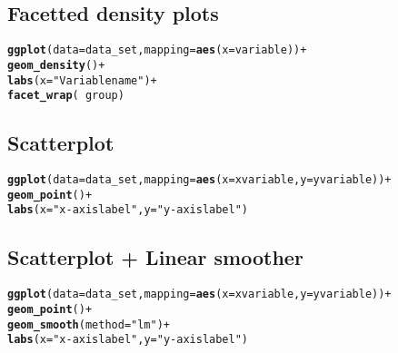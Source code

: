 \documentclass[10pt]{report}\usepackage[]{graphicx}\usepackage[]{color}
\makeatletter
\newcommand{\hlstr}[1]{\textcolor[rgb]{0.192,0.494,0.8}{#1}}%
\newcommand{\hlopt}[1]{\textcolor[rgb]{0,0,0}{#1}}%
\newcommand{\hlstd}[1]{\textcolor[rgb]{0.345,0.345,0.345}{#1}}%
\newcommand{\hlkwc}[1]{\textcolor[rgb]{0.333,0.667,0.333}{#1}}%
\newcommand{\hlkwd}[1]{\textcolor[rgb]{0.737,0.353,0.396}{\textbf{#1}}}%
\newenvironment{kframe}{%
 \def\at@end@of@kframe{}%
 \ifinner\ifhmode%
  \def\at@end@of@kframe{\end{minipage}}%
  \begin{minipage}{\columnwidth}%
 \fi\fi%
 \def\FrameCommand##1{\hskip\@totalleftmargin \hskip-\fboxsep
 \colorbox{shadecolor}{##1}\hskip-\fboxsep
     \hskip-\linewidth \hskip-\@totalleftmargin \hskip\columnwidth}%
 \MakeFramed {\advance\hsize-\width
   \@totalleftmargin\z@ \linewidth\hsize
   \@setminipage}}%
 {\par\unskip\endMakeFramed%
 \at@end@of@kframe}
\newenvironment{knitrout}{}{} %
\makeatother
\begin{document}
\begin{multicols}{2}
\subsection*{Facetted density plots}
\begin{knitrout}\small
{}\color{fgcolor}\begin{kframe}
\begin{alltt}
\hlkwd{ggplot}\hlstd{(}\hlkwc{data} \hlstd{= data_set,} \hlkwc{mapping} \hlstd{=} \hlkwd{aes}\hlstd{(}\hlkwc{x} \hlstd{= variable))} \hlopt{+}
  \hlkwd{geom_density}\hlstd{()} \hlopt{+}
  \hlkwd{labs}\hlstd{(}\hlkwc{x} \hlstd{=} \hlstr{"Variable name"}\hlstd{)} \hlopt{+}
  \hlkwd{facet_wrap}\hlstd{(}\hlopt{~} \hlstd{group)}
\end{alltt}
\end{kframe}
\end{knitrout}
\squeeze
\subsection*{Scatterplot}
\begin{knitrout}\small
{}\color{fgcolor}\begin{kframe}
\begin{alltt}
\hlkwd{ggplot}\hlstd{(}\hlkwc{data} \hlstd{= data_set,} \hlkwc{mapping} \hlstd{=} \hlkwd{aes}\hlstd{(}\hlkwc{x} \hlstd{= xvariable,} \hlkwc{y} \hlstd{= yvariable))} \hlopt{+}
  \hlkwd{geom_point}\hlstd{()} \hlopt{+}
  \hlkwd{labs}\hlstd{(}\hlkwc{x} \hlstd{=} \hlstr{"x-axis label"}\hlstd{,} \hlkwc{y} \hlstd{=} \hlstr{"y-axis label"}\hlstd{)}
\end{alltt}
\end{kframe}
\end{knitrout}
\squeeze
\subsection*{Scatterplot + Linear smoother}
\begin{knitrout}\small
{}\color{fgcolor}\begin{kframe}
\begin{alltt}
\hlkwd{ggplot}\hlstd{(}\hlkwc{data} \hlstd{= data_set,} \hlkwc{mapping} \hlstd{=} \hlkwd{aes}\hlstd{(}\hlkwc{x} \hlstd{= xvariable,} \hlkwc{y} \hlstd{= yvariable))} \hlopt{+}
  \hlkwd{geom_point}\hlstd{()} \hlopt{+}
  \hlkwd{geom_smooth}\hlstd{(}\hlkwc{method} \hlstd{=} \hlstr{"lm"}\hlstd{)} \hlopt{+}
  \hlkwd{labs}\hlstd{(}\hlkwc{x} \hlstd{=} \hlstr{"x-axis label"}\hlstd{,} \hlkwc{y} \hlstd{=} \hlstr{"y-axis label"}\hlstd{)}
\end{alltt}
\end{kframe}
\end{knitrout}


\end{multicols}
\end{document}
